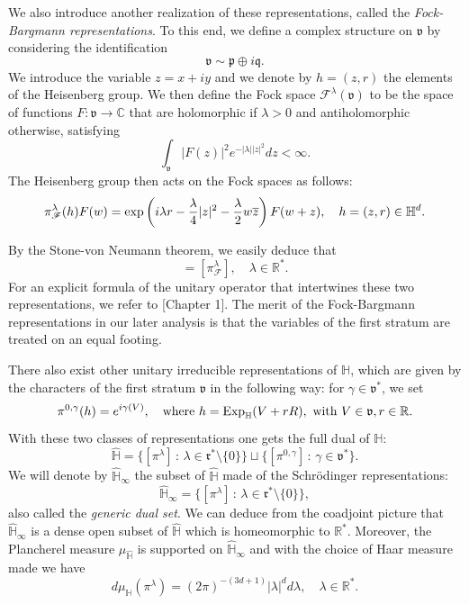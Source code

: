 \documentclass[12pt,a4paper]{amsart}
\theoremstyle{plain}
\theoremstyle{definition}
\theoremstyle{remark}
\numberwithin{equation}{section}
\theoremstyle{definition}
\def\R{{\mathbb R}}%
\def\C{{\mathbb C}}%
\def \Exp{{\rm Exp}}
\def \exp{{\rm exp}}
\def \Heis{\mathbb{H}}
\def \Hhat{\widehat{\Heis}}
\def \fv{\mathfrak{v}}
\def \fr{\mathfrak{r}}
\numberwithin{equation}{section}
\begin{document}
We also introduce another realization of these representations, called the \emph{Fock-Bargmann representations}. To this end, we define a complex structure on $\fv$ by considering the identification
\begin{equation*}
    \fv \sim \mathfrak{p}\oplus i\mathfrak{q}.
\end{equation*}
We introduce the variable $z=x+iy$ and we denote by $h=(z,r)$ the elements of the Heisenberg group.
We then define the Fock space $\mathscr{F}^\lambda(\fv)$ to be the space of functions $F:\fv\rightarrow\C$ that are holomorphic if $\lambda>0$ and antiholomorphic otherwise, satisfying
\begin{equation*}
 \int_\fv |F(z)|^2 e^{-|\lambda| |z|^2}dz<\infty.
\end{equation*}
The Heisenberg group then acts on the Fock spaces as follows:
\begin{equation}
    \label{eq:repfockbargmann}
    \pi^\lambda_\mathscr{F}(h) F(w) = \exp\left(i \lambda r - \frac{\lambda}{4}|z|^2-\frac{\lambda}{2}w \overline{z}\right) F(w+z),\quad h=(z,r)\in\Heis^d.
\end{equation}

By the Stone-von Neumann theorem, we easily deduce that
\begin{equation*}
    [\pi^\lambda] = [\pi^\lambda_\mathscr{F}],\quad \lambda\in\R^*.
\end{equation*}
For an explicit formula of the unitary operator that intertwines these two representations, we refer to \cite{Fol1}[Chapter 1]. The merit of the Fock-Bargmann representations in our later analysis is that the variables of the first stratum are treated on an equal footing.

There also exist other unitary irreducible representations of $\Heis$, which are given by the characters of the first stratum $\fv$ in the following way: for $\gamma\in\fv^*$, we set 
\begin{equation*}
 \pi^{0,\gamma}(h) = e^{i\gamma(V)},\quad\mbox{where}\ h = \Exp_\Heis(V+rR),\ \mbox{with}\ V\in\fv, r\in\R.
\end{equation*}
With these two classes of representations one gets the full dual of $\Heis$:
\begin{equation*}
 \Hhat = \{[\pi^\lambda]\,:\,\lambda\in\fr^{*}\setminus\{0\}\}\sqcup\{[\pi^{0,\gamma}]\,:\,\gamma\in\fv^*\}.
\end{equation*}
We will denote by $\Hhat_{\infty}$ the subset of $\Hhat$ made of the Schrödinger representations:
\begin{equation*}
 \Hhat_\infty = \{[\pi^\lambda]\,:\,\lambda\in\fr^{*}\setminus\{0\}\},
\end{equation*}
also called the \emph{generic dual set}.
We can deduce from the coadjoint picture that $\Hhat_\infty$ is a dense open subset of $\Hhat$ which is homeomorphic to $\R^*$.
Moreover, the Plancherel measure $\mu_{\Hhat}$ is supported on $\Hhat_\infty$ and with the choice of Haar measure made we have 
\begin{equation*}
 d\mu_{\Hhat}(\pi^\lambda) = (2\pi)^{-(3d+1)}|\lambda|^d d\lambda,\quad \lambda\in\R^*.
\end{equation*}
\end{document}
